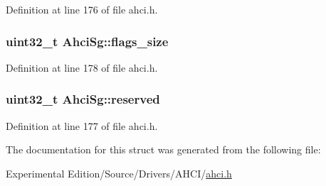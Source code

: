 Definition at line 176 of file ahci.\+h.

\subsubsection[{\texorpdfstring{flags\+\_\+size}{flags_size}}]{\setlength{\rightskip}{0pt plus 5cm}uint32\+\_\+t Ahci\+Sg\+::flags\+\_\+size}\hypertarget{structAhciSg_a280cf97b5fb219dd638a79c9af2bf938}{}\label{structAhciSg_a280cf97b5fb219dd638a79c9af2bf938}


Definition at line 178 of file ahci.\+h.

\subsubsection[{\texorpdfstring{reserved}{reserved}}]{\setlength{\rightskip}{0pt plus 5cm}uint32\+\_\+t Ahci\+Sg\+::reserved}\hypertarget{structAhciSg_a745f35097b6dd3d2cc3f51de60338691}{}\label{structAhciSg_a745f35097b6dd3d2cc3f51de60338691}


Definition at line 177 of file ahci.\+h.



The documentation for this struct was generated from the following file\+:\begin{DoxyCompactItemize}
\item 
Experimental Edition/\+Source/\+Drivers/\+A\+H\+C\+I/\hyperlink{ahci_8h}{ahci.\+h}\end{DoxyCompactItemize}
